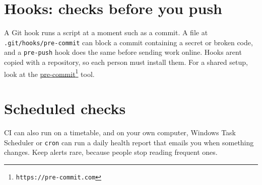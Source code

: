 \section{Hooks: checks before you push}\label{hooks-checks-before-you-push}

A Git hook runs a script at a moment such as a commit. A file at \texttt{.git/hooks/pre-commit} can block a commit containing a secret or broken code, and a \texttt{pre-push} hook does the same before sending work online. Hooks aren\textquotesingle t copied with a repository, so each person must install them. For a shared setup, look at the \href{https://pre-commit.com}{pre-commit}\footnote{\texttt{https://pre-commit.com}} tool.

\section{Scheduled checks}\label{scheduled-checks}

CI can also run on a timetable, and on your own computer, Windows Task Scheduler or \texttt{cron} can run a daily health report that emails you when something changes. Keep alerts rare, because people stop reading frequent ones.

